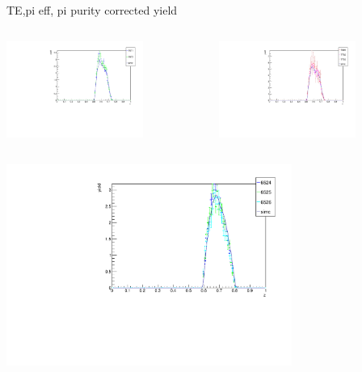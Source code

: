 \begin{frame}{TE,pi eff, pi purity corrected yield}
\begin{columns}
\begin{column}[T]{0.5\textwidth}
\includegraphics[width = 0.7\textwidth]{results/yield/check/yieldcheck_460_neg.pdf}
\end{column}
\begin{column}[T]{0.5\textwidth}
\includegraphics[width = 0.7\textwidth]{results/yield/check/yieldcheck_460_pos.pdf}
\end{column}
\end{columns}
\begin{columns}
\begin{column}[T]{0.5\textwidth}
\includegraphics[width = 0.7\textwidth]{results/yield/check/yieldcheck_360_neg.pdf}

\end{column}
\end{columns}
\end{frame}
